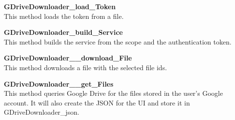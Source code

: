\textbf{GDriveDownloader\_load\_Token} \\
This method loads the token from a file.

\textbf{GDriveDownloader\_build\_Service} \\
This method builds the service from the scope and the authentication token.

\textbf{GDriveDownloader\_\_download\_File} \\
This method downloads a file with the selected file ids. 

\textbf{GDriveDownloader\_\_get\_Files} \\
This method queries Google Drive for the files stored in the user's Google account. It will also create the JSON for the UI and store it in GDriveDownloader\_json.   
